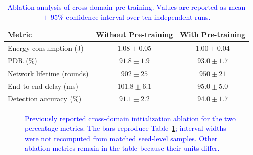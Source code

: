 \documentclass[pdflatex,sn-mathphys-num]{sn-jnl}
\newcommand{\Revised}[1]{\textcolor{blue}{#1}}
\begin{document}
\begin{table}[ht]
\centering
\caption{\textcolor{blue}{Ablation analysis of cross-domain pre-training.
Values are reported as mean $\pm$ 95\% confidence interval over ten
independent runs.}}
\label{tab:pretraining_ablation}
\begin{tabular}{lcc}
\toprule
\textbf{Metric} &
\textbf{Without Pre-training} &
\textbf{With Pre-training} \\
\midrule
Energy consumption (J)
& $1.08\pm0.05$
& $1.00\pm0.04$ \\

PDR (\%)
& $91.8\pm1.9$
& $93.0\pm1.7$ \\

Network lifetime (rounds)
& $902\pm25$
& $950\pm21$ \\

End-to-end delay (ms)
& $101.8\pm6.1$
& $95.0\pm5.0$ \\

Detection accuracy (\%)
& $91.1\pm2.2$
& $94.0\pm1.7$ \\
\bottomrule
\end{tabular}
\end{table}

\begin{figure}[!tb]
\centering
{}
\caption{\Revised{Previously reported cross-domain initialization ablation for the two percentage metrics. The bars reproduce Table~\ref{tab:pretraining_ablation}; interval widths were not recomputed from matched seed-level samples. Other ablation metrics remain in the table because their units differ.}}
\label{fig:ablation_percent_r2}
\end{figure}
\end{document}
